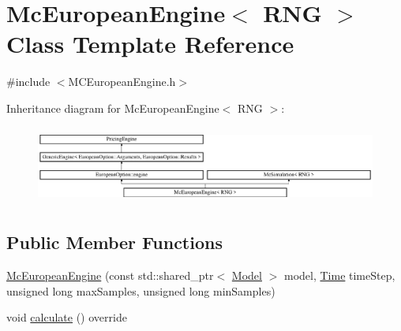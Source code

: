 \hypertarget{class_mc_european_engine}{}\section{Mc\+European\+Engine$<$ R\+NG $>$ Class Template Reference}
\label{class_mc_european_engine}


{\ttfamily \#include $<$M\+C\+European\+Engine.\+h$>$}

Inheritance diagram for Mc\+European\+Engine$<$ R\+NG $>$\+:\begin{figure}[H]
\begin{center}
\leavevmode
\includegraphics[height=2.586605cm]{class_mc_european_engine}
\end{center}
\end{figure}
\subsection*{Public Member Functions}
\begin{DoxyCompactItemize}
\item 
\hyperlink{class_mc_european_engine_a22424812ecaf6e04134eeaa45b9d1e1f}{Mc\+European\+Engine} (const std\+::shared\+\_\+ptr$<$ \hyperlink{class_model}{Model} $>$ model, \hyperlink{_name_def_8h_ac2d3e0ba793497bcca555c7c2cf64ff3}{Time} time\+Step, unsigned long max\+Samples, unsigned long min\+Samples)
\item 
void \hyperlink{class_mc_european_engine_a6c29ef7a7ba6cd1a2f93ee63070cf40e}{calculate} () override
\end{DoxyCompactItemize}
